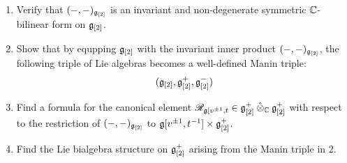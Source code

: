            \begin{question} \label{question: multiloop_lie_bialgebras}
                \begin{enumerate}
                    \item Verify that $(-, -)_{\mathfrak{g}_{[2]}}$ is an invariant and non-degenerate symmetric $\mathbb{C}$-bilinear form on $\mathfrak{g}_{[2]}$.
                    \item Show that by equpping $\mathfrak{g}_{[2]}$ with the invariant inner product $(-, -)_{\mathfrak{g}_{[2]}}$, the following triple of Lie algebras becomes a well-defined Manin triple:
                        $$(\mathfrak{g}_{[2]}, \mathfrak{g}_{[2]}^+, \mathfrak{g}_{[2]}^-)$$
                    \item Find a formula for the canonical element $\scrR_{\g[v^{\pm 1}, t} \in \g_{[2]}^+ \hattensor_{\bbC} \g_{[2]}^+$ with respect to the restriction of $(-, -)_{\mathfrak{g}_{[2]}}$ to $\g[v^{\pm 1}, t^{-1}] \x \g_{[2]}^+$.
                    \item Find the Lie bialgebra structure on $\mathfrak{g}_{[2]}^+$ arising from the Manin triple in 2.
                \end{enumerate}
            \end{question}
